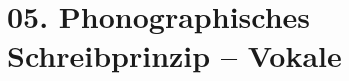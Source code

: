 \documentclass[handout,aspectratio=1610,dvipsnames]{beamer}
\begin{document}
  \section[Vokalschreibungen]{05. Phonographisches Schreibprinzip -- Vokale}
  \let\woopsi\section\let\section\subsection\let\subsection\subsubsection
  
  \let\subsection\section\let\section\woopsi
  
\end{document}
